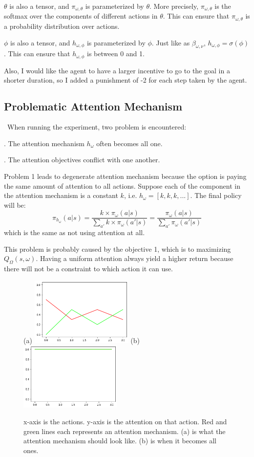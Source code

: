 \documentclass{article}
\begin{document}
	\quad $\theta$ is also a tensor, and $\pi_{\omega, \theta}$ is parameterized by $\theta$. More precisely, $\pi_{\omega, \theta}$ is the softmax over the components of different actions in $\theta$. This can ensure that $\pi_{\omega, \theta}$ is a probability distribution over actions.
	
	\quad $\phi$ is also a tensor, and $h_{\omega, \phi}$ is parameterized by $\phi$. Just like as $\beta_{\omega, \nu}$, $h_{\omega, \phi} = \sigma(\phi)$. This can ensure that $h_{\omega, \phi}$ is between 0 and 1.

	\quad Also, I would like the agent to have a larger incentive to go to the goal in a shorter duration, so I added a punishment of -2 for each step taken by the agent.
	\subsection*{Problematic Attention Mechanism}
	\qquad \ When running the experiment, two problem is encountered:
	
	. The attention mechanism $h_\omega$ often becomes all one. 
	
	. The attention objectives conflict with one another.
	
	\quad Problem 1 leads to degenerate attention mechanism because the option is paying the same amount of attention to all actions. Suppose each of the component in the attention mechanism is a constant $k$, i.e. $h_\omega = [k, k, k, ...]$. The final policy will be:
	$$\pi_{h_\omega}(a|s) = \frac{k \times \pi_\omega(a|s)}{\sum_{a'} k \times \pi_\omega(a'|s)} = \frac{\pi_\omega(a|s)}{\sum_{a'}\pi_\omega(a'|s)}$$
	which is the same as not using attention at all.
	
	\quad This problem is probably caused by the objective 1, which is to maximizing $Q_\Omega(s,\omega)$. Having a uniform attention always yield a higher return because there will not be a constraint to which action it can use.
	\begin{figure}[h]
		\centering
		\small{(a)}
		\includegraphics[width=2in]{attentionViz.png}
		\hspace{0.2in}
		\small{(b)}
		\includegraphics[width=2in]{all1s.png}
		\hspace{0.2in}
		\caption{x-axis is the actions. y-axis is the attention on that action. Red and green lines each represents an attention mechanism. (a) is what the attention mechanism should look like. (b) is when it becomes all ones.}
	\end{figure}
\end{document}
